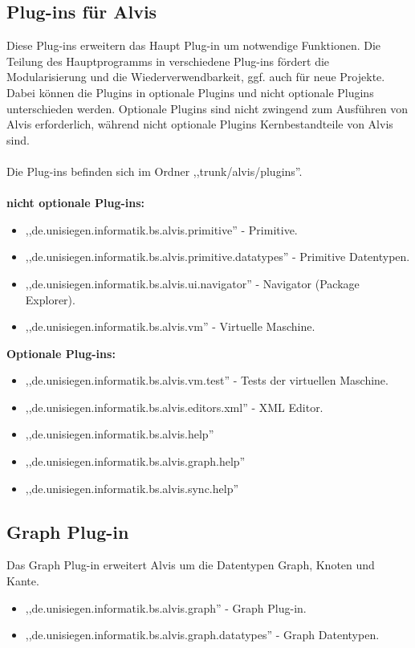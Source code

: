 \documentclass[10pt,a4paper,oneside]{scrbook}
\begin{document}
\subsection{Plug-ins für Alvis}
Diese Plug-ins erweitern das Haupt Plug-in um notwendige Funktionen. Die Teilung des Hauptprogramms in verschiedene Plug-ins fördert die Modularisierung und die Wiederverwendbarkeit, ggf. auch für neue Projekte.
\\
Dabei können die Plugins in optionale Plugins und nicht optionale Plugins unterschieden werden. Optionale Plugins sind nicht zwingend zum Ausführen von Alvis erforderlich, während nicht optionale Plugins Kernbestandteile von Alvis sind.
\\ \\
Die Plug-ins befinden sich im Ordner ,,trunk/alvis/plugins''.
\\ \\
\textbf{nicht optionale Plug-ins:}
\begin{itemize}
\item ,,de.unisiegen.informatik.bs.alvis.primitive'' - Primitive.
\item ,,de.unisiegen.informatik.bs.alvis.primitive.datatypes'' - Primitive Datentypen.
\item ,,de.unisiegen.informatik.bs.alvis.ui.navigator'' - Navigator (Package Explorer).
\item ,,de.unisiegen.informatik.bs.alvis.vm'' - Virtuelle Maschine.
\end{itemize}
\textbf{Optionale Plug-ins:}
\begin{itemize}
\item ,,de.unisiegen.informatik.bs.alvis.vm.test'' - Tests der virtuellen Maschine.
\item ,,de.unisiegen.informatik.bs.alvis.editors.xml'' - XML Editor.
\item ,,de.unisiegen.informatik.bs.alvis.help''
\item ,,de.unisiegen.informatik.bs.alvis.graph.help''
\item ,,de.unisiegen.informatik.bs.alvis.sync.help''
\end{itemize}
\subsection{Graph Plug-in}
Das Graph Plug-in erweitert Alvis um die Datentypen Graph, Knoten und Kante.
\begin{itemize}
\item ,,de.unisiegen.informatik.bs.alvis.graph'' - Graph Plug-in.
\item ,,de.unisiegen.informatik.bs.alvis.graph.datatypes'' - Graph Datentypen.
\end{itemize}
\end{document}

